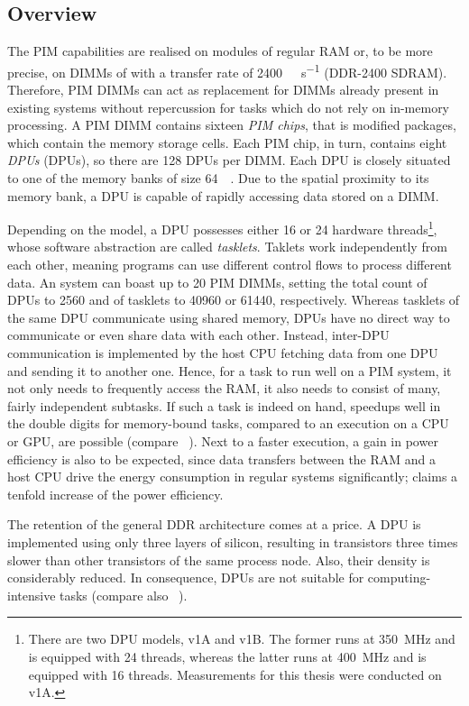 \subsection{Overview}
\label{sec:prereq:arch:overview}

The \ac{PIM} capabilities are realised on modules of regular \ac{RAM} or, to be more precise, on \acp{DIMM} of   with a transfer rate of \qty{2400}{\mega\transfer\per\second} (\acs{DDR}-2400 \acs{SDRAM}).
Therefore, \ac{PIM} \acp{DIMM} can act as replacement for \acp{DIMM} already present in existing systems without repercussion for tasks which do not rely on in-memory processing.
A \ac{PIM} \ac{DIMM} contains sixteen \emph{PIM chips}, that is modified  packages, which contain the memory storage cells.
Each \ac{PIM} chip, in turn, contains eight \emph{\aclp{DPU}} (\acsp{DPU}), so there are 128 \acp{DPU} per \ac{DIMM}.
Each \ac{DPU} is closely situated to one of the memory banks of size \qty{64}{\mebi\byte}.
Due to the spatial proximity to its memory bank, a \ac{DPU} is capable of rapidly accessing data stored on a \ac{DIMM}.

Depending on the model, a \ac{DPU} possesses either 16 or 24 hardware threads\footnote{
	There are two \ac{DPU} models, v1A and v1B.
	The former runs at \qty{350}{\mega\hertz} and is equipped with 24 threads, whereas the latter runs at \qty{400}{\mega\hertz} and is equipped with 16 threads.
	Measurements for this thesis were conducted on v1A.
}, whose software abstraction are called \emph{tasklets}.
Taklets work independently from each other, meaning programs can use different control flows to process different data.
An \upmem{} system can boast up to 20 \ac{PIM} \acp{DIMM}, setting the total count of \acp{DPU} to \num{2560} and of tasklets to \num{40960} or \num{61440}, respectively.
Whereas tasklets of the same \ac{DPU} communicate using shared memory, \acp{DPU} have no direct way to communicate or even share data with each other.
Instead, inter-\ac{DPU} communication is implemented by the host \ac{CPU} fetching data from one \ac{DPU} and sending it to another one.
Hence, for a task to run well on a \ac{PIM} system, it not only needs to frequently access the \ac{RAM}, it also needs to consist of many, fairly independent subtasks.
If such a task is indeed on hand, speedups well in the double digits for memory-bound tasks, compared to an execution on a \ac{CPU} or \ac{GPU}, are possible (compare \citeauthor{mutlu2022Benchmarking}~\cite{mutlu2022Benchmarking}).
Next to a faster execution, a gain in power efficiency is also to be expected, since data transfers between the \ac{RAM} and a host \ac{CPU} drive the energy consumption in regular systems significantly;
\upmem{} claims a tenfold increase of the power efficiency.

The retention of the general \ac{DDR} architecture comes at a price.
A \ac{DPU} is implemented using only three layers of silicon, resulting in transistors three times slower than other transistors of the same process node.
Also, their density is considerably reduced.
In consequence, \acp{DPU} are not suitable for computing-intensive tasks (compare also \citeauthor{mutlu2022Benchmarking}~\cite{mutlu2022Benchmarking}).
